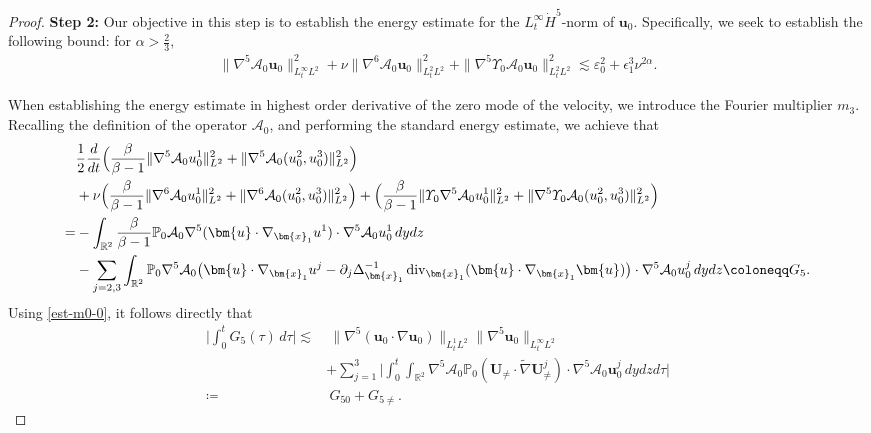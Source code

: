 \documentclass[11pt,reqno]{article}
\numberwithin{equation}{section}
\newcommand\R{{\mathbb R}}
\newcommand\PP{{\mathbb P}}
\newcommand\A{\mathcal{A}}
\newcommand\x{\bm{x}}
\newcommand\uu{\bm{u}}
\newcommand\U{\bm{U}}
\newcommand \tri {\coloneqq}
\let\pa=\partial
\let\al=\alpha
\let\var=\varepsilon
\let\f=\frac
\let\ep=\epsilon
\def\dive{\mathop{\rm div}\nolimits}
\begin{document}
\begin{proof}
\noindent\textbf{Step 2:}
Our objective in this step is to establish the energy estimate for the $L^\infty_t\dot{H}^5$-norm of $\uu_0$. Specifically, we seek to establish the following bound: for $\alpha>\f23,$
\begin{align}\label{est-step1}
      \|\nabla^5\A_0\uu_0\|_{L^\infty_tL^{2}}^2
        +\nu \|\nabla^6\A_0\uu_0\|_{L^2_tL^{2}}^2
        +\|\nabla^5\varUpsilon_0\A_0\uu_0\|_{L^2_tL^{2}}^2
        \lesssim \var_0^2+\ep_1^3\nu^{2\al}.
\end{align}

When establishing the energy estimate in highest order derivative of the zero mode of the velocity, we introduce the Fourier multiplier $m_3$.
Recalling the definition of the operator $\A_0$, and performing the standard energy estimate, we achieve that
\begin{align}
	&\f12\f{d}{dt}
	\Big(
	\f{\beta}{\beta-1}\|\nabla^5\A_0u_0^1\|_{L^2}^2
    +\|\nabla^5\A_0(u_0^2,u_0^3)\|_{L^2}^2
	\Big)
		\nonumber\\
      &%
      +\nu\Big(\f{\beta}{\beta-1}\|\nabla^{6}\A_0u_0^1\|_{L^2}^2
    +\|\nabla^{6}\A_0(u_0^2,u_0^3)\|_{L^2}^2
	\Big) + \Big(\f{\beta}{\beta-1}\|\varUpsilon_0\nabla^{5}\A_0u_0^1\|_{L^2}^2 +\|\nabla^{5}\varUpsilon_0\A_0(u_0^2,u_0^3)\|_{L^2}^2
	\Big) 	\nonumber\\
	=&-\int_{\R^2}	\f{\beta}{\beta-1}\PP_0\A_0\nabla^5(\uu\cdot\nabla_{\x_1} u^1)\cdot \nabla^5\A_0u_0^1\,dydz
    \nonumber\\  
    &
    -\sum_{j=2,3}\int_{\R^2}\PP_0\nabla^5\A_0\big(\uu\cdot\nabla_{\x_1} u^j-\pa_j \Delta_{\x_1}^{-1}\dive_{\x_1}(\uu\cdot\nabla_{\x_1} \uu)\big)\cdot \nabla^5\A_0 u_0^j \,dydz
	\tri  G_5.
	\label{energy-0-2}
\end{align}
Using \eqref{est-m0-0}, it follows directly that
\begin{align}\label{est-G5}
    \Big|\int_0^t G_5(\tau)\,d\tau\Big|
    \lesssim&~ \|\nabla^5(\uu_0\cdot\nabla\uu_0)\|_{L^1_tL^2}
    \|\nabla^5 \uu_0\|_{L^\infty_tL^2}
    \nonumber
    \\
    &
    +\sum_{j=1}^3\Big|\int_0^t \int_{\R^2}
    \nabla^5\A_0\PP_0(\U_{\not=}\cdot\widetilde{\nabla}\U_{\not=}^j)\cdot\nabla^5 \A_0 \uu_0^j \,dydzd\tau \Big|
    \nonumber
    \\
    \tri&~ G_{50}+G_{5\not=}.

\end{align}
\end{proof}
\end{document}
